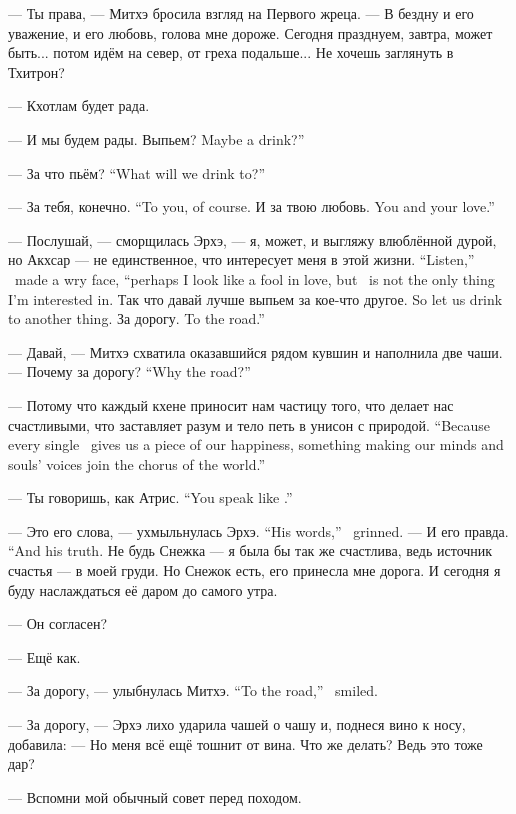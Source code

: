 --- Ты права, --- Митхэ бросила взгляд на Первого жреца.
--- В бездну и его уважение, и его любовь, голова мне дороже.
Сегодня празднуем, завтра, может быть... потом идём на север, от греха подальше...
Не хочешь заглянуть в Тхитрон?

--- Кхотлам будет рада.

--- И мы будем рады.
{Выпьем?}
{Maybe a drink?''}

{--- За что пьём?}
{``What will we drink to?''}

{--- За тебя, конечно.}
{``To you, of course.}
{И за твою любовь.}
{You and your love.''}

{--- Послушай, --- сморщилась Эрхэ, --- я, может, и выгляжу влюблённой дурой, но Акхсар --- не единственное, что интересует меня в этой жизни.}
{``Listen,'' \Oerchoe\ made a wry face, ``perhaps I look like a fool in love, but \Akchsar\ is not the only thing I'm interested in.}
{Так что давай лучше выпьем за кое-что другое.}
{So let us drink to another thing.}
{За дорогу.}
{To the road.''}

--- Давай, --- Митхэ схватила оказавшийся рядом кувшин и наполнила две чаши.
{--- Почему за дорогу?}
{``Why the road?''}

{--- Потому что каждый кхене приносит нам частицу того, что делает нас счастливыми, что заставляет разум и тело петь в унисон с природой.}
{``Because every single \kchenoel\ gives us a piece of our happiness, something making our minds and souls' voices join the chorus of the world.''}

{--- Ты говоришь, как Атрис.}
{``You speak like \Aatris.''}

{--- Это его слова, --- ухмыльнулась Эрхэ.}
{``His words,'' \Oerchoe\ grinned.}
{--- И его правда.}
{``And his truth.}
Не будь Снежка --- я была бы так же счастлива, ведь источник счастья --- в моей груди.
Но Снежок есть, его принесла мне дорога.
И сегодня я буду наслаждаться её даром до самого утра.

--- Он согласен?

--- Ещё как.

{--- За дорогу, --- улыбнулась Митхэ.}
{``To the road,'' \Mitchoe\ smiled.}

--- За дорогу, --- Эрхэ лихо ударила чашей о чашу и, поднеся вино к носу, добавила:
--- Но меня всё ещё тошнит от вина.
Что же делать?
Ведь это тоже дар?

--- Вспомни мой обычный совет перед походом.

